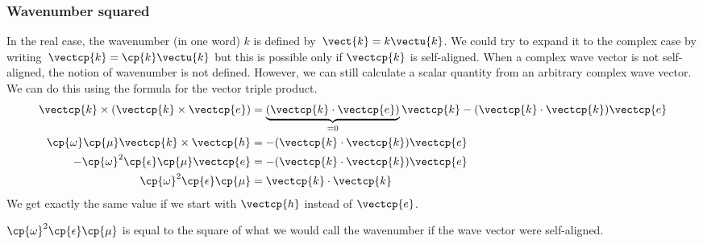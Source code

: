 \begin{refsection}
\subsubsection{Wavenumber squared}
\label{sec:wavenumber_squared}
In the real case, the wavenumber (in one word) $k$ is defined by~$\vect{k}=k \vectu{k}$.
We could try to expand it to the complex case by writing~$\vectcp{k}=\cp{k} \vectu{k}$
but this is possible only if $\vectcp{k}$ is self-aligned.
When a complex wave vector is not self-aligned, the notion of wavenumber is not defined.
However, we can still calculate a scalar quantity from an arbitrary complex wave vector.
We can do this using the formula for the vector triple product.
\begin{subequations}
    \label{eq:k_dot_k}
    \begin{align}
        \vectcp{k} \times (\vectcp{k} \times \vectcp{e})
        &=
        \underbrace{(\vectcp{k} \cdot \vectcp{e})}_{=0}\vectcp{k}
        -
        (\vectcp{k} \cdot \vectcp{k}) \vectcp{e}
        \\
        \cp{\omega} \cp{\mu} \vectcp{k} \times \vectcp{h}
        &=
        -(\vectcp{k} \cdot \vectcp{k}) \vectcp{e}
        \\
        -\cp{\omega}^2 \cp{\epsilon} \cp{\mu} \vectcp{e}
        &=
        -(\vectcp{k} \cdot \vectcp{k}) \vectcp{e}
        \\
        \cp{\omega}^2 \cp{\epsilon} \cp{\mu}
        &=
        \vectcp{k} \cdot \vectcp{k}
    \end{align}
\end{subequations}
We get exactly the same value if we start with $\vectcp{h}$ instead of $\vectcp{e}$.

$\cp{\omega}^2 \cp{\epsilon} \cp{\mu}$ is equal to the square of what we would call the wavenumber if the wave vector were self-aligned.


\end{refsection}
